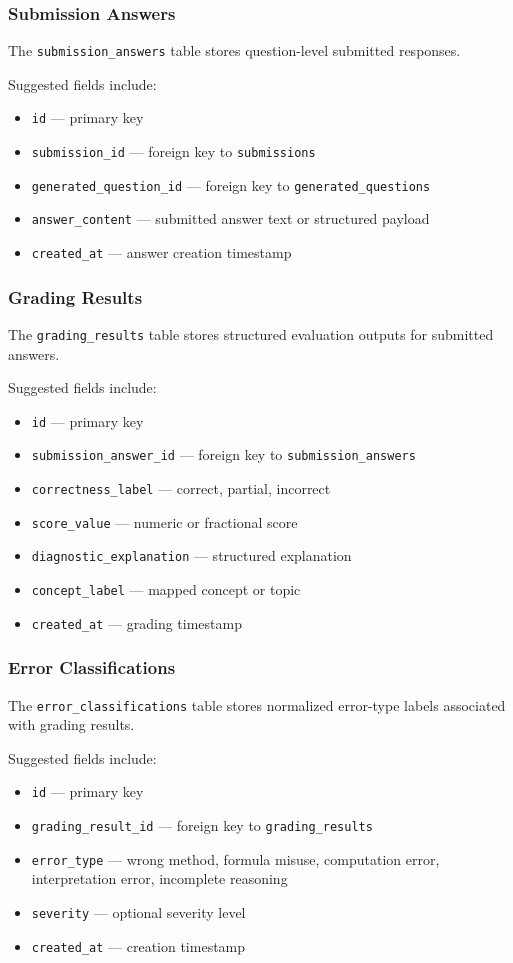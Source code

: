 \documentclass[11pt]{article}
\begin{document}
\subsubsection{Submission Answers}
The \texttt{submission\_answers} table stores question-level submitted responses.

Suggested fields include:
\begin{itemize}
\item \texttt{id} --- primary key
\item \texttt{submission\_id} --- foreign key to \texttt{submissions}
\item \texttt{generated\_question\_id} --- foreign key to \texttt{generated\_questions}
\item \texttt{answer\_content} --- submitted answer text or structured payload
\item \texttt{created\_at} --- answer creation timestamp
\end{itemize}

\subsubsection{Grading Results}
The \texttt{grading\_results} table stores structured evaluation outputs for submitted answers.

Suggested fields include:
\begin{itemize}
\item \texttt{id} --- primary key
\item \texttt{submission\_answer\_id} --- foreign key to \texttt{submission\_answers}
\item \texttt{correctness\_label} --- correct, partial, incorrect
\item \texttt{score\_value} --- numeric or fractional score
\item \texttt{diagnostic\_explanation} --- structured explanation
\item \texttt{concept\_label} --- mapped concept or topic
\item \texttt{created\_at} --- grading timestamp
\end{itemize}

\subsubsection{Error Classifications}
The \texttt{error\_classifications} table stores normalized error-type labels associated with grading results.

Suggested fields include:
\begin{itemize}
\item \texttt{id} --- primary key
\item \texttt{grading\_result\_id} --- foreign key to \texttt{grading\_results}
\item \texttt{error\_type} --- wrong method, formula misuse, computation error, interpretation error, incomplete reasoning
\item \texttt{severity} --- optional severity level
\item \texttt{created\_at} --- creation timestamp
\end{itemize}
\end{document}
